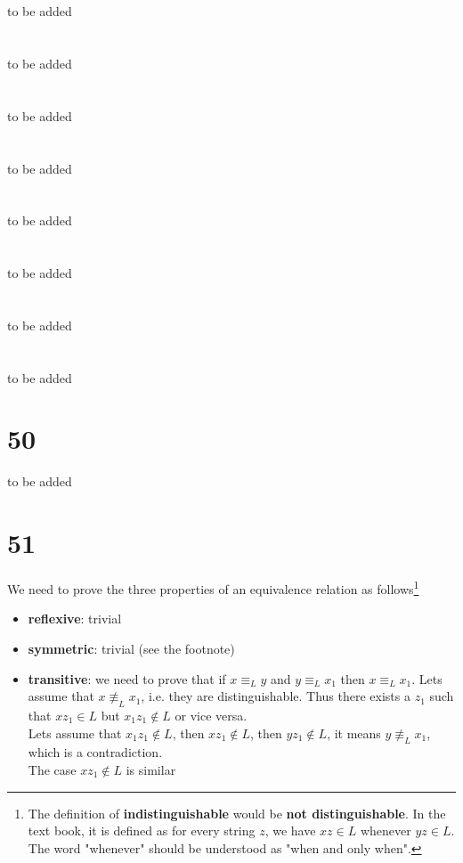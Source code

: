 \documentclass[12pt]{book}
\begin{document}
\section{}
to be added
\section{}
to be added
\section{}
to be added
\section{}
to be added
\section{}
to be added
\section{}
to be added
\section{}
to be added
\section{}
to be added
\section{50}
to be added
\section{51}
We need to prove the three properties of an equivalence relation as follows\footnote{The definition of \textbf{indistinguishable} would be \textbf{not distinguishable}. In the text book, it is defined as  for every string $z$, we have $xz \in L$ whenever $yz \in L$. The word "whenever" should be understood as "when and only when".}
\begin{itemize}
	\item \textbf{reflexive}:
	trivial
	\item \textbf{symmetric}:
	trivial (see the footnote)
	\item  \textbf{transitive}:
	we need to prove that if $x\equiv_{L}y$ and $y\equiv_{L}x_1$ then  $x\equiv_{L}x_1$. Lets assume that $x\not\equiv_{L}x_1$, i.e. they are distinguishable. Thus there exists a $z_1$ such that $xz_1 \in  L$ but $x_1z_1 \not\in L$ or vice versa.\\ 
	Lets assume that $x_1z_1 \not\in L$, then $xz_1 \not\in L$, then $yz_1 \not\in L$, it means $y\not\equiv_{L}x_1$, which is a contradiction.\\
	The case $xz_1 \not\in L$ is similar
\end{itemize}
\end{document}
